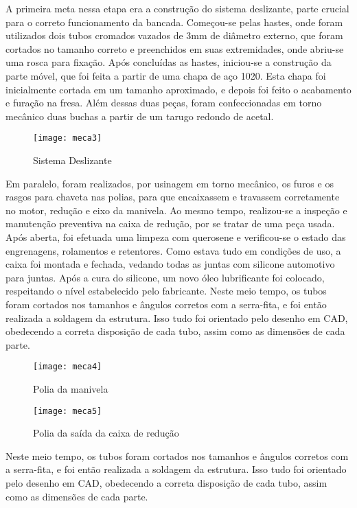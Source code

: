 	A primeira meta nessa etapa era a construção do sistema deslizante, parte crucial para o correto funcionamento da bancada. Começou-se pelas hastes, onde foram utilizados dois tubos cromados vazados de 3mm de diâmetro externo, que foram cortados no tamanho correto e preenchidos em suas extremidades, onde abriu-se uma rosca para fixação. Após concluídas as hastes, iniciou-se a construção da parte móvel, que foi feita a partir de uma chapa de aço 1020. Esta chapa foi inicialmente cortada em um tamanho aproximado, e depois foi feito o acabamento e furação na fresa. Além dessas duas peças, foram confeccionadas em torno mecânico duas buchas a partir de um tarugo redondo de acetal.

	\begin{figure}[!htpb]
		\centering
		\texttt{[image: meca3]}
		\caption{Sistema Deslizante}
		\label{meca3}
	\end{figure}
	
	Em paralelo, foram realizados, por usinagem em torno mecânico, os furos e os rasgos para chaveta nas polias, para que encaixassem e travassem corretamente no motor, redução e eixo da manivela. Ao mesmo tempo, realizou-se a inspeção e manutenção preventiva na caixa de redução, por se tratar de uma peça usada. Após aberta, foi efetuada uma limpeza com querosene e verificou-se o estado das engrenagens, rolamentos e retentores. Como estava tudo em condições de uso, a caixa foi montada e fechada, vedando todas as juntas com silicone automotivo para juntas. Após a cura do silicone, um novo óleo lubrificante foi colocado, respeitando o nível estabelecido pelo fabricante. Neste meio tempo, os tubos foram cortados nos tamanhos e ângulos corretos com a serra-fita, e foi então realizada a soldagem da estrutura. Isso tudo foi orientado pelo desenho em CAD, obedecendo a correta disposição de cada tubo, assim como as dimensões de cada parte.

	\begin{figure}[!htpb]
		\centering
		\texttt{[image: meca4]}
		\caption{Polia da manivela}
		\label{meca4}
	\end{figure}

	\begin{figure}[!htpb]
		\centering
		\texttt{[image: meca5]}
		\caption{Polia da saída da caixa de redução}
		\label{meca5}
	\end{figure}

	\newpage
	Neste meio tempo, os tubos foram cortados nos tamanhos e ângulos corretos com a serra-fita, e foi então realizada a soldagem da estrutura. Isso tudo foi orientado pelo desenho em CAD, obedecendo a correta disposição de cada tubo, assim como as dimensões de cada parte.


